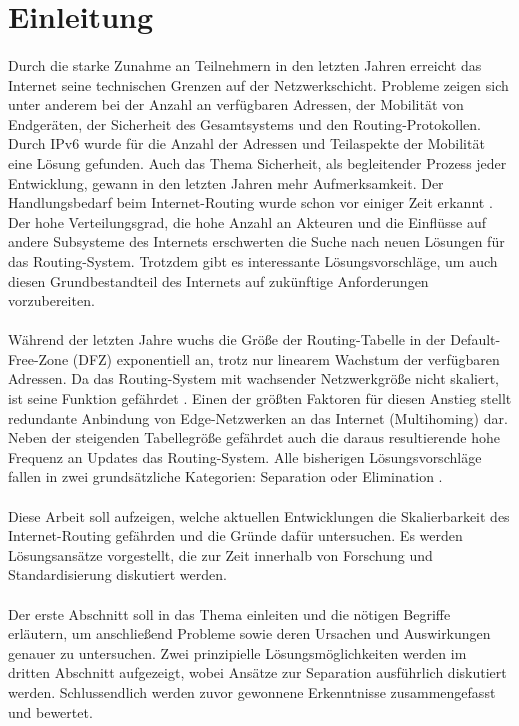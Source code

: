 \section{Einleitung}

\paragraph{}
Durch die starke Zunahme an Teilnehmern in den letzten Jahren erreicht das Internet seine technischen Grenzen auf der Netzwerkschicht. Probleme zeigen sich unter anderem bei der Anzahl an verfügbaren Adressen, der Mobilität von Endgeräten, der Sicherheit des Gesamtsystems und den Routing-Protokollen. Durch IPv6 wurde für die Anzahl der Adressen und Teilaspekte der Mobilität eine Lösung gefunden. Auch das Thema Sicherheit, als begleitender Prozess jeder Entwicklung, gewann in den letzten Jahren mehr Aufmerksamkeit. Der Handlungsbedarf beim Internet-Routing wurde schon vor einiger Zeit erkannt \cite{deering:1996:map}. Der hohe Verteilungsgrad, die hohe Anzahl an Akteuren und die Einflüsse auf andere Subsysteme des Internets erschwerten die Suche nach neuen Lösungen für das Routing-System. Trotzdem gibt es interessante Lösungsvorschläge, um auch diesen Grundbestandteil des Internets auf zukünftige Anforderungen vorzubereiten. 

\paragraph{} 
Während der letzten Jahre wuchs die Größe der Routing-Tabelle in der Default-Free-Zone (DFZ) exponentiell an, trotz nur linearem Wachstum der verfügbaren Adressen\cite{huston:2001:analyzing}. Da das Routing-System mit wachsender Netzwerkgröße nicht skaliert, ist seine Funktion gefährdet \cite{jen:2008:start}. Einen der größten Faktoren für diesen Anstieg stellt redundante Anbindung von Edge-Netzwerken an das Internet (Multihoming) dar. Neben der steigenden Tabellegröße gefährdet auch die daraus resultierende hohe Frequenz an Updates das Routing-System. Alle bisherigen Lösungsvorschläge fallen in zwei grundsätzliche Kategorien: Separation oder Elimination \cite{jen:2008:start}. 

\paragraph{}
Diese Arbeit soll aufzeigen, welche aktuellen Entwicklungen die Skalierbarkeit des Internet-Routing gefährden und die Gründe dafür untersuchen. Es werden Lösungsansätze vorgestellt, die zur Zeit innerhalb von Forschung und Standardisierung diskutiert werden.

\paragraph{}
Der erste Abschnitt soll in das Thema einleiten und die nötigen Begriffe erläutern, um anschließend Probleme sowie deren Ursachen und Auswirkungen genauer zu untersuchen. Zwei prinzipielle Lösungsmöglichkeiten werden im dritten Abschnitt aufgezeigt, wobei Ansätze zur Separation ausführlich diskutiert werden. Schlussendlich werden zuvor gewonnene Erkenntnisse zusammengefasst und bewertet.

 
